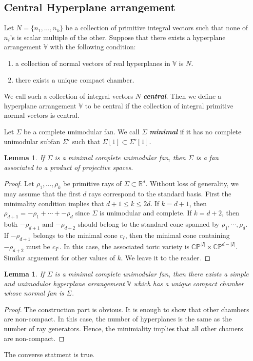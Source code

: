 \documentclass[12pt, a4paper]{article}
\newtheorem{lem}[theorem]{Lemma}
\theoremstyle{definition}
\theoremstyle{remark}
\renewcommand{\emph}[1]{\textit{\textbf{#1}}}
\begin{document}
\subsection{Central Hyperplane arrangement}

Let $N=\{n_1, \dots, n_k\}$ be a collection of primitive integral vectors such that none of $n_i$'s is scalar multiple of the other. Suppose that there exists a hyperplane arrangement $\mathbb{V}$ with the following condition:
\begin{enumerate}
    \item a collection of normal vectors of real hyperplanes in $\mathbb{V}$ is $N$.
    \item there exists a unique compact chamber. 
\end{enumerate}
We call such a collection of integral vectors $N$ \emph{central}. Then we define a hyperplane arrangement $\mathbb{V}$ to be central if the collection of integral primitive normal vectors is central. 

Let $\Sigma$ be a complete unimodular fan. We call $\Sigma$ \emph{minimal} if it has no complete unimodular subfan $\Sigma'$ such that $\Sigma[1] \subset \Sigma'[1]$. 
\begin{lem}
    If $\Sigma$ is a minimal complete unimodular fan, then $\Sigma$ is a fan associated to a product of projective spaces. 
\end{lem}
\begin{proof}
    Let $\rho_1, \dots, \rho_k$ be primitive rays of $\Sigma \subset \mathbb{R}^d$. Without loss of generality, we may assume that the first $d$ rays correspond to the standard basis. First the minimality condition implies that $d+1 \leq k \leq 2d$. If $k=d+1$, then $\rho_{d+1}=-\rho_1 + \cdots + -\rho_d$ since $\Sigma$ is unimodular and complete. If $k=d+2$, then both $-\rho_{d+1}$ and $-\rho_{d+2}$ should belong to the standard cone spanned by $\rho_1, \cdots, \rho_d$. If $-\rho_{d+1}$ belongs to the minimal cone $c_I$, then the minimal cone containing $-\rho_{d+2}$ must be $c_{I^c}$. In this case, the associated toric variety is $\mathbb{CP}^{|I|} \times \mathbb{CP}^{d-|I|}$. Similar arguement for other values of $k$. We leave it to the reader. 
\end{proof}

\begin{lem}
    If $\Sigma$ is a minimal complete unimodular fan, then there exists a simple and unimodular hyperplane arrangement $\mathbb{V}$ which has a unique compact chamber whose normal fan is $\Sigma$. 
\end{lem}
\begin{proof}
    The construction part is obvious. It is enough to show that other chambers are non-compact. In this case, the number of hyperplanes is the same as the number of ray generators. Hence, the minimiality implies that all other chamers are non-compact. 
\end{proof}
The converse statment is true. 
\end{document}
